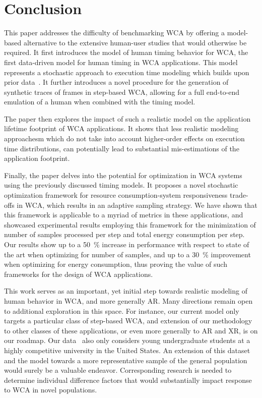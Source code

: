 \section{Conclusion}\label{sec:conclusion}

This paper addresses the difficulty of benchmarking \ac{WCA} by offering a model-based alternative to the extensive human-user studies that would otherwise be required.
It first introduces the \edgedroid{} model of human timing behavior for \ac{WCA}, the first data-driven model for human timing in \ac{WCA} applications.
This model represents a stochastic approach to execution time modeling which builds upon prior data~\cite{olguinmunoz:impact2021}.
It further introduces a novel procedure for the generation of synthetic traces of frames in step-based \ac{WCA}, allowing for a full end-to-end emulation of a human when combined with the timing model.

The paper then explores the impact of such a realistic model on the application lifetime footprint of \ac{WCA} applications.
It shows that less realistic modeling approachesm which do not take into account higher-order effects on execution time distributions, can potentially lead to substantial mis-estimations of the application footprint.

Finally, the paper delves into the potential for optimization in \ac{WCA} systems using the previously discussed timing models.
It proposes a novel stochastic optimization framework for resource consumption-system responsiveness trade-offs in \ac{WCA}, which results in an adaptive sampling strategy. 
We have shown that this framework is applicable to a myriad of metrics in these applications, and showcased experimental results employing this framework for the minimization of number of samples processed per step and total energy consumption per step.
Our results show up to a \SI{50}{\percent} increase in performance with respect to state of the art when optimizing for number of samples, and up to a \SI{30}{\percent} improvement when optimizing for energy consumption, thus proving the value of such frameworks for the design of \ac{WCA} applications.

This work serves as an important, yet initial step towards realistic modeling of human behavior in \ac{WCA}, and more generally \ac{AR}.
Many directions remain open to additional exploration in this space.
For instance, our current model only targets a particular class of step-based \ac{WCA}, and extension of our methodology to other classes of these applications, or even more generally to \ac{AR} and \ac{XR}, is on our roadmap.
Our data~\cite{olguinmunoz:impact2021} also only considers young undergraduate students at a highly competitive university in the United States.
An extension of this dataset and the model towards a more representative sample of the general population would surely be a valuable endeavor.
Corresponding research is needed to determine individual difference factors that would substantially impact response to \ac{WCA} in novel populations.

